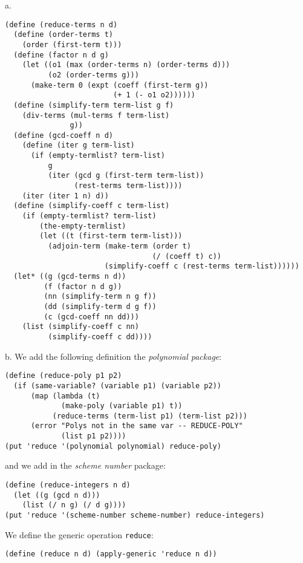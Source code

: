 \documentclass[a4paper,12pt]{article}
\newcommand{\subpar}[1] {\medskip \noindent #1.}
\begin{document}
\subpar{a}
\begin{lstlisting}
(define (reduce-terms n d)
  (define (order-terms t)
    (order (first-term t)))
  (define (factor n d g)
    (let ((o1 (max (order-terms n) (order-terms d)))
          (o2 (order-terms g)))
      (make-term 0 (expt (coeff (first-term g))
                         (+ 1 (- o1 o2))))))
  (define (simplify-term term-list g f)
    (div-terms (mul-terms f term-list)
               g))
  (define (gcd-coeff n d)
    (define (iter g term-list)
      (if (empty-termlist? term-list)
          g
          (iter (gcd g (first-term term-list))
                (rest-terms term-list))))
    (iter (iter 1 n) d))
  (define (simplify-coeff c term-list)
    (if (empty-termlist? term-list)
        (the-empty-termlist)
        (let ((t (first-term term-list)))
          (adjoin-term (make-term (order t)
                                  (/ (coeff t) c))
                       (simplify-coeff c (rest-terms term-list))))))
  (let* ((g (gcd-terms n d))
         (f (factor n d g))
         (nn (simplify-term n g f))
         (dd (simplify-term d g f))
         (c (gcd-coeff nn dd)))
    (list (simplify-coeff c nn)
          (simplify-coeff c dd))))
\end{lstlisting}

\subpar{b}  We add the following definition the \emph{polynomial
  package}: 
\begin{lstlisting}
(define (reduce-poly p1 p2)
  (if (same-variable? (variable p1) (variable p2))
      (map (lambda (t)
             (make-poly (variable p1) t))
           (reduce-terms (term-list p1) (term-list p2)))
      (error "Polys not in the same var -- REDUCE-POLY"
             (list p1 p2))))
(put 'reduce '(polynomial polynomial) reduce-poly)
\end{lstlisting}
and we add in the \emph{scheme number} package:
\begin{lstlisting}
(define (reduce-integers n d)
  (let ((g (gcd n d)))
    (list (/ n g) (/ d g))))
(put 'reduce '(scheme-number scheme-number) reduce-integers)
\end{lstlisting}
We define the generic operation \lstinline!reduce!:
\begin{lstlisting}
(define (reduce n d) (apply-generic 'reduce n d))
\end{lstlisting}
\end{document}
